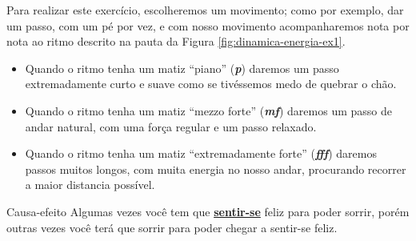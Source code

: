 \begin{example}
Para realizar este exercício, escolheremos um movimento; como por exemplo,
dar um passo, com um pé por vez, 
e com nosso movimento acompanharemos nota por nota 
ao ritmo descrito na pauta da Figura \ref{fig:dinamica-energia-ex1}.
\begin{itemize}
\item Quando o ritmo tenha um matiz ``piano'' (\textbf{\textit{p}}) 
daremos um passo extremadamente curto e suave como se tivéssemos medo de quebrar o chão.
\item Quando o ritmo tenha um matiz ``mezzo forte'' (\textbf{\textit{mf}}) 
daremos um passo de andar natural, com uma força regular e um passo relaxado. 
\item Quando o ritmo tenha um matiz ``extremadamente forte''  (\textbf{\textit{fff}}) 
daremos passos muitos longos, com muita energia no nosso andar, 
procurando recorrer a maior distancia possível.
\end{itemize}
\end{example}

\begin{FraseFernandoPR}{Causa-efeito}
Algumas vezes você tem que \hyperref[ref:emotionsentimental]{\textbf{sentir-se}} feliz para poder sorrir,
porém outras vezes você terá que sorrir para poder chegar a sentir-se feliz. %
\end{FraseFernandoPR}

